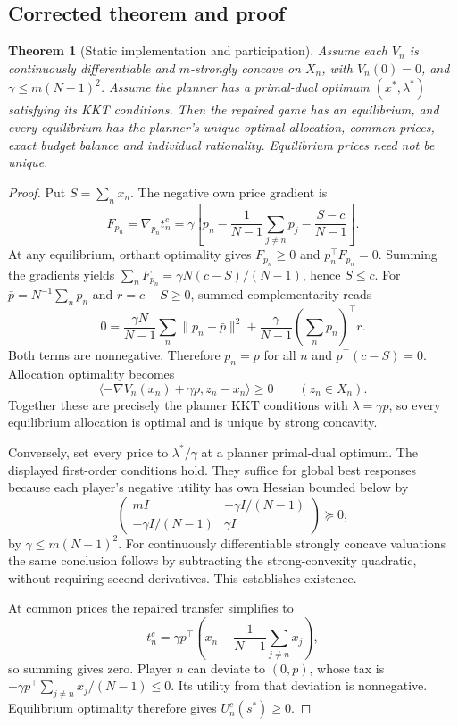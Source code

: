 \documentclass[11pt]{article}
\newtheorem{theorem}{Theorem}
\begin{document}
\subsection{Corrected theorem and proof}
\begin{theorem}[Static implementation and participation]\label{repair-theorem}
Assume each $V_n$ is continuously differentiable and $m$-strongly concave
on $X_n$, with $V_n(0)=0$, and $\gamma\le m(N-1)^2$.
Assume the planner has a primal-dual optimum $(x^*,\lambda^*)$
satisfying its KKT conditions. Then the repaired game has an equilibrium,
and every equilibrium has the planner's unique optimal allocation,
common prices, exact budget balance and individual rationality.
Equilibrium prices need not be unique.
\end{theorem}
\begin{proof}
Put $S=\sum_nx_n$. The negative own price gradient is
\[
 F_{p_n}=\nabla_{p_n}t_n^c
 =\gamma\left[p_n-\frac1{N-1}\sum_{j\ne n}p_j
 -\frac{S-c}{N-1}\right].
\]
At any equilibrium, orthant optimality gives
$F_{p_n}\ge0$ and $p_n^\top F_{p_n}=0$.
Summing the gradients yields
$\sum_nF_{p_n}=\gamma N(c-S)/(N-1)$, hence $S\le c$.
For $\bar p=N^{-1}\sum_np_n$ and $r=c-S\ge0$,
summed complementarity reads
\[
 0=\frac{\gamma N}{N-1}\sum_n\|p_n-\bar p\|^2
 +\frac{\gamma}{N-1}\left(\sum_np_n\right)^\top r.
\]
Both terms are nonnegative. Therefore $p_n=p$ for all $n$ and
$p^\top(c-S)=0$. Allocation optimality becomes
\[
 \langle-\nabla V_n(x_n)+\gamma p,z_n-x_n\rangle\ge0
 \qquad(z_n\in X_n).
\]
Together these are precisely the planner KKT conditions with
$\lambda=\gamma p$, so every equilibrium allocation is optimal and
is unique by strong concavity.

Conversely, set every price to $\lambda^*/\gamma$ at a planner
primal-dual optimum. The displayed first-order conditions hold.
They suffice for global best responses because each player's negative
utility has own Hessian bounded below by
\[
 \begin{pmatrix}
 mI&-\gamma I/(N-1)\\
 -\gamma I/(N-1)&\gamma I
 \end{pmatrix}\succeq0,
\]
by $\gamma\le m(N-1)^2$. For continuously differentiable strongly
concave valuations the same conclusion follows by subtracting the
strong-convexity quadratic, without requiring second derivatives.
This establishes existence.

At common prices the repaired transfer simplifies to
\[
 t_n^c=\gamma p^\top
 \left(x_n-\frac1{N-1}\sum_{j\ne n}x_j\right),
\]
so summing gives zero. Player $n$ can deviate to $(0,p)$, whose tax is
$-\gamma p^\top\sum_{j\ne n}x_j/(N-1)\le0$.
Its utility from that deviation is nonnegative. Equilibrium optimality
therefore gives $U_n^c(s^*)\ge0$.
\end{proof}
\end{document}
